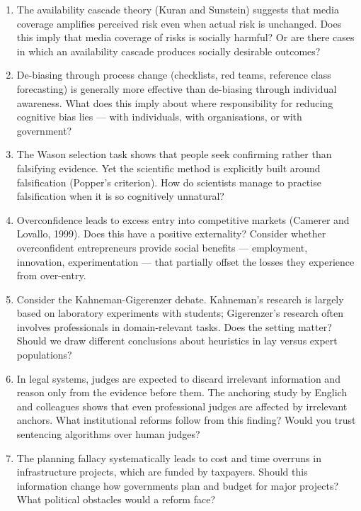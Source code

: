 \documentclass[12pt, letterpaper]{article}
\begin{document}
\begin{enumerate}
\item The availability cascade theory (Kuran and Sunstein) suggests that media coverage amplifies perceived risk even when actual risk is unchanged. Does this imply that media coverage of risks is socially harmful? Or are there cases in which an availability cascade produces socially desirable outcomes?

\item De-biasing through process change (checklists, red teams, reference class forecasting) is generally more effective than de-biasing through individual awareness. What does this imply about where responsibility for reducing cognitive bias lies --- with individuals, with organisations, or with government?

\item The Wason selection task shows that people seek confirming rather than falsifying evidence. Yet the scientific method is explicitly built around falsification (Popper's criterion). How do scientists manage to practise falsification when it is so cognitively unnatural?

\item Overconfidence leads to excess entry into competitive markets (Camerer and Lovallo, 1999). Does this have a positive externality? Consider whether overconfident entrepreneurs provide social benefits --- employment, innovation, experimentation --- that partially offset the losses they experience from over-entry.

\item Consider the Kahneman-Gigerenzer debate. Kahneman's research is largely based on laboratory experiments with students; Gigerenzer's research often involves professionals in domain-relevant tasks. Does the setting matter? Should we draw different conclusions about heuristics in lay versus expert populations?

\item In legal systems, judges are expected to discard irrelevant information and reason only from the evidence before them. The anchoring study by Englich and colleagues shows that even professional judges are affected by irrelevant anchors. What institutional reforms follow from this finding? Would you trust sentencing algorithms over human judges?

\item The planning fallacy systematically leads to cost and time overruns in infrastructure projects, which are funded by taxpayers. Should this information change how governments plan and budget for major projects? What political obstacles would a reform face?


\end{enumerate}
\end{document}

